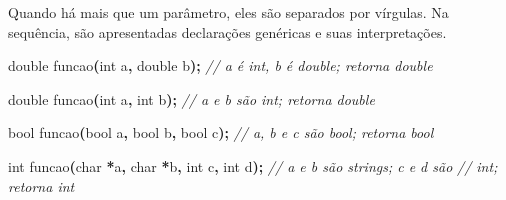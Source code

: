 \documentclass[
  11pt,
  a4paper,
]{scrbook}
\newenvironment{Shaded}{\begin{snugshade}}{\end{snugshade}}
\newcommand{\CommentTok}[1]{\textcolor[rgb]{0.56,0.35,0.01}{\textit{#1}}}
\newcommand{\DataTypeTok}[1]{\textcolor[rgb]{0.13,0.29,0.53}{#1}}
\newcommand{\NormalTok}[1]{#1}
\newcommand{\OperatorTok}[1]{\textcolor[rgb]{0.81,0.36,0.00}{\textbf{#1}}}
\begin{document}
Quando há mais que um parâmetro, eles são separados por vírgulas. Na
sequência, são apresentadas declarações genéricas e suas interpretações.

\begin{Shaded}
\begin{Highlighting}[]
\DataTypeTok{double}\NormalTok{ funcao}\OperatorTok{(}\DataTypeTok{int}\NormalTok{ a}\OperatorTok{,} \DataTypeTok{double}\NormalTok{ b}\OperatorTok{);}  \CommentTok{// a é int, b é double; retorna double}
\end{Highlighting}
\end{Shaded}

\begin{Shaded}
\begin{Highlighting}[]
\DataTypeTok{double}\NormalTok{ funcao}\OperatorTok{(}\DataTypeTok{int}\NormalTok{ a}\OperatorTok{,} \DataTypeTok{int}\NormalTok{ b}\OperatorTok{);}  \CommentTok{// a e b são int; retorna double}
\end{Highlighting}
\end{Shaded}

\begin{Shaded}
\begin{Highlighting}[]
\DataTypeTok{bool}\NormalTok{ funcao}\OperatorTok{(}\DataTypeTok{bool}\NormalTok{ a}\OperatorTok{,} \DataTypeTok{bool}\NormalTok{ b}\OperatorTok{,} \DataTypeTok{bool}\NormalTok{ c}\OperatorTok{);}  \CommentTok{// a, b e c são bool; retorna bool}
\end{Highlighting}
\end{Shaded}

\begin{Shaded}
\begin{Highlighting}[]
\DataTypeTok{int}\NormalTok{ funcao}\OperatorTok{(}\DataTypeTok{char} \OperatorTok{*}\NormalTok{a}\OperatorTok{,} \DataTypeTok{char} \OperatorTok{*}\NormalTok{b}\OperatorTok{,} \DataTypeTok{int}\NormalTok{ c}\OperatorTok{,} \DataTypeTok{int}\NormalTok{ d}\OperatorTok{);}  \CommentTok{// a e b são strings; c e d são}
                                             \CommentTok{// int; retorna int}
\end{Highlighting}
\end{Shaded}
\end{document}
